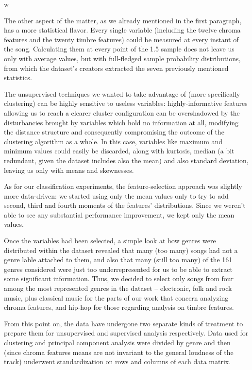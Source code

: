w\documentclass[11pt, oneside]{article}
\begin{document}
The other aspect of the matter, as we already mentioned in the first paragraph, has a more statistical flavor. Every single variable (including the twelve chroma features and the twenty timbre features) could be measured at every instant of the song. Calculating them at every point of the 1.5 sample does not leave us only with average values, but with full-fledged sample probability distributions, from which the dataset's creators extracted the seven previously mentioned statistics.

The unsupervised techniques we wanted to take advantage of (more specifically clustering) can be highly sensitive to useless variables: highly-informative features allowing us to reach a clearer cluster configuration can be overshadowed by the disturbancies brought by variables which hold no information at all, modifying the distance structure and consequently compromising the outcome of the clustering algorithm as a whole. In this case, variables like maximum and minimum values could easily be discarded, along with kurtosis, median (a bit redundant, given the dataset includes also the mean) and also standard deviation, leaving us only with means and skewnesses.

As for our classification experiments, the feature-selection approach was slightly more data-driven: we started using only the mean values only to try to add second, third and fourth moments of the features’ distributions. Since we weren't able to see any substantial performance improvement, we kept only the mean values.

Once the variables had been selected, a simple look at how genres were distributed within the dataset revealed that many (too many) songs had not a genre lable attached to them, and also that many (still too many) of the 161 genres considered were just too underrepresented for us to be able to extract some significant information. Thus, we decided to select only songs from four among the most represented genres in the dataset -- electronic, folk and rock music, plus classical music for the parts of our work that concern analyzing chroma features, and hip-hop for those regarding analysis on timbre features.

From this point on, the data have undergone two separate kinds of treatment to prepare them for unsupervised and supervised analysis respectively. Data used for clustering and principal component analysis were divided by genre and then (since chroma features means are not invariant to the general loudness of the track) underwent standardization on rows and columns of each data matrix.
\end{document}
